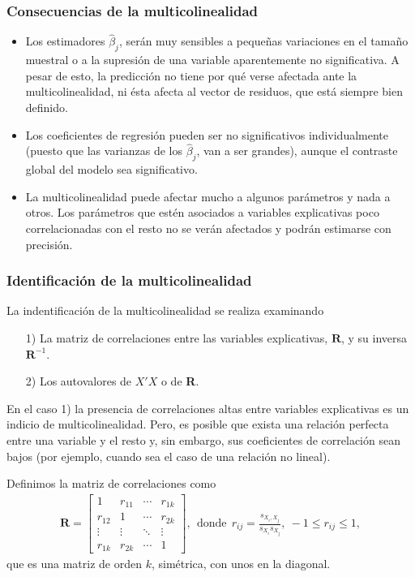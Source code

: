 \subsubsection{Consecuencias de la multicolinealidad}

\begin{itemize}
    \item Los estimadores $\widehat{\beta}_j$, serán muy sensibles a pequeñas variaciones en el tamaño muestral o a la supresión de una variable aparentemente no significativa. A pesar de esto, la predicción no tiene por qué verse afectada ante la multicolinealidad, ni ésta afecta al vector de residuos, que está siempre bien definido.
    \item Los coeficientes de regresión pueden ser no significativos individualmente (puesto que las varianzas de los $\widehat{\beta}_j$, van a ser grandes), aunque el contraste global del modelo sea significativo.
    \item La multicolinealidad puede afectar mucho a algunos parámetros y nada a otros. Los parámetros que estén asociados a variables explicativas poco correlacionadas con el resto no se verán afectados y podrán estimarse con precisión.
\end{itemize}

\subsubsection{Identificación de la multicolinealidad}
La indentificación de la multicolinealidad se realiza examinando
\begin{enumerate}
    \item[1)] La matriz de correlaciones entre las variables explicativas, $\textbf{R}$, y su inversa $\textbf{R}^{-1}$.
    \item[2)] Los autovalores de $X'X$ o de \textbf{R}.
\end{enumerate}

En el caso 1) la presencia de correlaciones altas entre variables explicativas es un indicio de
multicolinealidad. Pero, es posible que exista una relación perfecta entre una variable y el resto y, sin embargo, sus coeficientes de correlación sean bajos (por ejemplo, cuando sea el caso de una relación no lineal).

Definimos la matriz de correlaciones como
\begin{align*}
    \textbf{R} = \begin{bmatrix}
                     1      & r_{11} & \cdots & r_{1k} \\
                     r_{12} & 1      & \cdots & r_{2k} \\
                     \vdots & \vdots & \ddots & \vdots \\
                     r_{1k} & r_{2k} & \cdots & 1
                 \end{bmatrix}, \ \ \text{donde} \ \ r_{ij} = \frac{s_{X_i,X_j}}{s_{X_i}s_{X_j}}, \ -1 \leq r_{ij} \leq 1,
\end{align*}
que es una matriz de orden $k$, simétrica, con unos en la diagonal.

